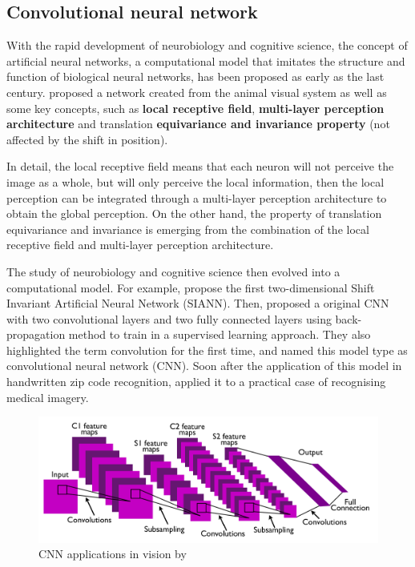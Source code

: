 \subsection{Convolutional neural network} %
With the rapid development of neurobiology and cognitive science, the concept of artificial neural networks, a computational model that imitates the structure and function of biological neural networks, has been proposed as early as the last century.
\citet{fukushima1980neocognitron} proposed a network created from the animal visual system as well as some key concepts, such as \textbf{local receptive field}, \textbf{multi-layer perception architecture} and translation \textbf{equivariance and invariance property} (not affected by the shift in position).

In detail, the local receptive field means that each neuron will not perceive the image as a whole, but will only perceive the local information, then the local perception can be integrated through a multi-layer perception architecture to obtain the global perception.
On the other hand, the property of translation equivariance and invariance is emerging from the combination of the local receptive field and multi-layer perception architecture.

The study of neurobiology and cognitive science then evolved into a computational model. For example, \citet{zhang1988shift} propose the first two-dimensional Shift Invariant Artificial Neural Network (SIANN).
Then, \citet{lecun1989backpropagation} proposed a original CNN with two convolutional layers and two fully connected layers using back-propagation method to train in a supervised learning approach.
They also highlighted the term convolution for the first time, and named this model type as convolutional neural network (CNN).
Soon after the application of this model in handwritten zip code recognition, \citet{zhang1994computerized} applied it to a practical case of recognising medical imagery.

\begin{figure}[ht!]
    \centering
    \includegraphics[width=\textwidth]{literature/imgs/ext-lecun-cnn-arch.png}
    \caption{CNN applications in vision by \citet{lecun2010convolutional}}
    \label{fig:ext-lecun-cnn-arch}
\end{figure}

